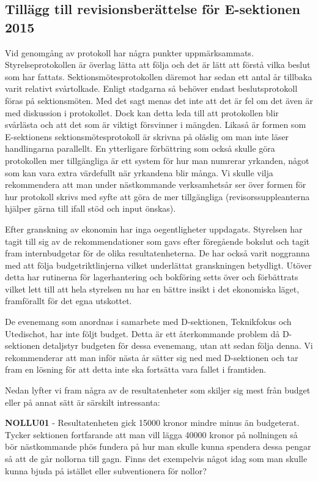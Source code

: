 \documentclass[../_main/handlingar.tex]{subfiles}
\begin{document}
\subsection{Tillägg till revisionsberättelse för E-sektionen 2015}
Vid genomgång av protokoll har några punkter uppmärksammats. Styrelseprotokollen är överlag lätta att följa och det är lätt att förstå vilka beslut som har fattats. Sektionsmötesprotokollen däremot har sedan ett antal år tillbaka varit relativt svårtolkade. Enligt stadgarna så behöver endast beslutsprotokoll föras på sektionsmöten. Med det sagt menas det inte att det är fel om det även är med diskussion i protokollet. Dock kan detta leda till att protokollen blir svårlästa och att det som är viktigt försvinner i mängden. Likaså är formen som E-sektionens sektionsmötesprotokoll är skrivna på oläslig om man inte läser handlingarna parallellt. En ytterligare förbättring som också skulle göra protokollen mer tillgängliga är ett system för hur man numrerar yrkanden, något som kan vara extra värdefullt när yrkandena blir många. Vi skulle vilja rekommendera att man under nästkommande verksamhetsår ser över formen för hur protokoll skrivs med syfte att göra de mer tillgängliga (revisorssuppleanterna hjälper gärna till ifall stöd och input önskas).

Efter granskning av ekonomin har inga oegentligheter uppdagats. Styrelsen har tagit till sig av de rekommendationer som gavs efter föregående bokslut och tagit fram internbudgetar för de olika resultatenheterna. De har också varit noggranna med att följa budgetriktlinjerna vilket underlättat granskningen betydligt. Utöver detta har rutinerna för lagerhantering och bokföring setts över och förbättrats vilket lett till att hela styrelsen nu har en bättre insikt i det ekonomiska läget, framförallt för det egna utskottet.

De evenemang som anordnas i samarbete med D-sektionen, Teknikfokus och Utedischot, har inte följt budget. Detta är ett återkommande problem då D-sektionen detaljstyr budgeten för dessa evenemang, utan att sedan följa denna. Vi rekommenderar att man inför nästa år sätter sig ned med D-sektionen och tar fram en lösning för att detta inte ska fortsätta vara fallet i framtiden.

Nedan lyfter vi fram några av de resultatenheter som skiljer sig mest från budget eller på annat sätt är särskilt intressanta:

\textbf{NOLLU01} - Resultatenheten gick 15000 kronor mindre minus än budgeterat. Tycker sektionen fortfarande att man vill lägga 40000 kronor på nollningen så bör nästkommande phös fundera på hur man skulle kunna spendera dessa pengar så att de går nollorna till gagn. Finns det exempelvis något idag som man skulle kunna bjuda på istället eller subventionera för nollor?
\end{document}
